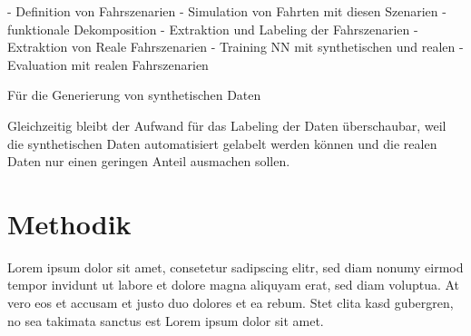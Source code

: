 - Definition von Fahrszenarien
- Simulation von Fahrten mit diesen Szenarien
- funktionale Dekomposition
- Extraktion und Labeling der Fahrszenarien
- Extraktion von Reale Fahrszenarien
- Training NN mit synthetischen und realen
- Evaluation mit realen Fahrszenarien



Für die Generierung von synthetischen Daten 



Gleichzeitig bleibt der Aufwand für das Labeling der Daten überschaubar, weil die synthetischen Daten automatisiert gelabelt werden können und die realen Daten nur einen geringen Anteil ausmachen sollen.

\section{Methodik}
\label{konzept_methodik}

Lorem ipsum dolor sit amet, consetetur sadipscing elitr, sed diam nonumy eirmod tempor invidunt ut labore et dolore magna aliquyam erat, sed diam voluptua. At vero eos et accusam et justo duo dolores et ea rebum. Stet clita kasd gubergren, no sea takimata sanctus est Lorem ipsum dolor sit amet.  






